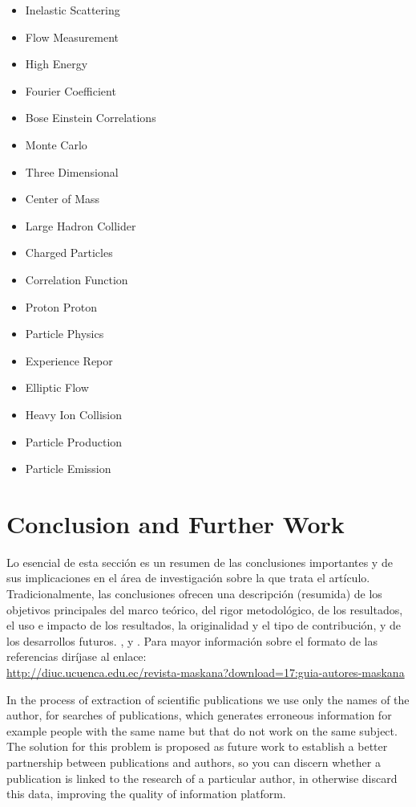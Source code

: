 \documentclass[11pt]{article}
\begin{document}
\begin{multicols}{2}
    \begin{itemize}
	\item Inelastic Scattering
	\item Flow Measurement
	\item High Energy
	\item Fourier Coefficient
	\item Bose Einstein Correlations
	\item Monte Carlo
	\item Three Dimensional
	\item Center of Mass
	\item Large Hadron Collider
	\item Charged Particles
	\item Correlation Function
	\item Proton Proton
	\item Particle Physics
	\item Experience Repor
	\item Elliptic Flow
	\item Heavy Ion Collision
	\item Particle Production
	\item Particle Emission
    \end{itemize}
    \end{multicols}
    



\section{Conclusion and Further Work}

Lo esencial de esta sección es un resumen de las conclusiones importantes y de sus 
implicaciones en el área de investigación sobre la que trata el artículo. Tradicionalmente, las 
conclusiones ofrecen una descripción (resumida) de los objetivos principales del marco teórico, del 
rigor metodológico, de los resultados, el uso e impacto de los resultados, la originalidad y el tipo de 
contribución, y de los desarrollos futuros. \cite{knuth:84}, \cite{boulic:91} y \cite{smith:99}. Para mayor información sobre el formato de las referencias diríjase al enlace:\\ \url{http://diuc.ucuenca.edu.ec/revista-maskana?download=17:guia-autores-maskana}


In the process of extraction of scientific publications we use only the names of the author, for searches of publications, which generates erroneous information for example people with the same name but that  do not work on the same subject. The solution for this problem  is proposed as future work to establish a better partnership between publications and authors, so you can discern whether a publication is linked to the research of a particular author, in otherwise discard this data, improving the quality of information platform.
\end{document}
